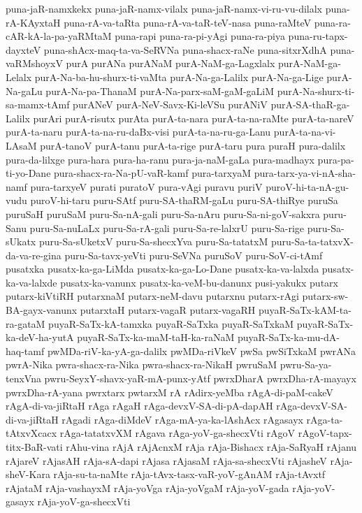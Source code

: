 {puna-jaR-namxkekx
puna-jaR-namx-vilalx
puna-jaR-namx-vi-ru-vu-dilalx
puna-rA-KAyxtaH
puna-rA-va-taRta
puna-rA-va-taR-teV-nasa
puna-raMteV
puna-ra-cAR-kA-la-pa-yaRMtaM
puna-rapi
puna-ra-pi-yAgi
puna-ra-piya
puna-ru-tapx-dayxteV
puna-shAcx-maq-ta-va-SeRVNa
puna-shacx-raNe
puna-sitxrXdhA
puna-vaRMshoyxV
purA
purANa
purANaM
purA-NaM-ga-Lagxlalx
purA-NaM-ga-Lelalx
purA-Na-ba-hu-shurx-ti-vaMta
purA-Na-ga-Lalilx
purA-Na-ga-Lige
purA-Na-gaLu
purA-Na-pa-ThanaM
purA-Na-parx-saM-gaM-gaLiM
purA-Na-shurx-ti-sa-mamx-tAmf
purANeV
purA-NeV-Savx-Ki-leVSu
purANiV
purA-SA-thaR-ga-Lalilx
purAri
purA-risutx
purAta
purA-ta-nara
purA-ta-na-raMte
purA-ta-nareV
purA-ta-naru
purA-ta-na-ru-daBx-visi
purA-ta-na-ru-ga-Lanu
purA-ta-na-vi-LAsaM
purA-tanoV
purA-tanu
purA-ta-rige
purA-taru
pura
puraH
pura-dalilx
pura-da-lilxge
pura-hara
pura-ha-ranu
pura-ja-naM-gaLa
pura-madhayx
pura-pa-ti-yo-Dane
pura-shacx-ra-Na-pU-vaR-kamf
pura-tarxyaM
pura-tarx-ya-vi-nA-sha-namf
pura-tarxyeV
purati
puratoV
pura-vAgi
puravu
puriV
puroV-hi-ta-nA-gu-vudu
puroV-hi-taru
puru-SAtf
puru-SA-thaRM-gaLu
puru-SA-thiRye
puruSa
puruSaH
puruSaM
puru-Sa-nA-gali
puru-Sa-nAru
puru-Sa-ni-goV-sakxra
puru-Sanu
puru-Sa-nuLaLx
puru-Sa-rA-gali
puru-Sa-re-lalxrU
puru-Sa-rige
puru-Sa-sUkatx
puru-Sa-sUketxV
puru-Sa-shecxYva
puru-Sa-tatatxM
puru-Sa-ta-tatxvX-da-va-re-gina
puru-Sa-tavx-yeVti
puru-SeVNa
puruSoV
puru-SoV-ci-tAmf
pusatxka
pusatx-ka-ga-LiMda
pusatx-ka-ga-Lo-Dane
pusatx-ka-va-lalxda
pusatx-ka-va-lalxde
pusatx-ka-vanunx
pusatx-ka-veM-bu-danunx
pusi-yakukx
putarx
putarx-kiVtiRH
putarxnaM
putarx-neM-davu
putarxnu
putarx-rAgi
putarx-sw-BA-gayx-vanunx
putarxtaH
putarx-vagaR
putarx-vagaRH
puyaR-SaTx-kAM-ta-ra-gataM
puyaR-SaTx-kA-tamxka
puyaR-SaTxka
puyaR-SaTxkaM
puyaR-SaTx-ka-deV-ha-yutA
puyaR-SaTx-ka-maM-taH-ka-raNaM
puyaR-SaTx-ka-mu-dA-haq-tamf
pwMDa-riV-ka-yA-ga-dalilx
pwMDa-riVkeV
pwSa
pwSiTxkaM
pwrANa
pwrA-Nika
pwra-shacx-ra-Nika
pwra-shacx-ra-NikaH
pwruSaM
pwru-Sa-ya-tenxVna
pwru-SeyxY-shavx-yaR-mA-punx-yAtf
pwrxDharA
pwrxDha-rA-mayayx
pwrxDha-rA-yana
pwrxtarx
pwtarxM
rA
rAdirx-yeMba
rAgA-di-paM-cakeV
rAgA-di-va-jiRtaH
rAga
rAgaH
rAga-devxV-SA-di-pA-dapAH
rAga-devxV-SA-di-va-jiRtaH
rAgadi
rAga-diMdeV
rAga-mA-ya-ka-lAshAcx
rAgasayx
rAga-ta-tAtxvXcacx
rAga-tatatxvXM
rAgava
rAga-yoV-ga-shecxVti
rAgoV
rAgoV-tapx-titx-BaR-vati
rAhu-vina
rAjA
rAjAcnxM
rAja
rAja-Bishacx
rAja-SaRyaH
rAjanu
rAjareV
rAjasAH
rAja-sA-dapi
rAjasa
rAjasaM
rAja-sa-shecxVti
rAjasheV
rAja-sheV-Kara
rAja-su-ta-naMte
rAja-tAvx-tasx-vaR-yoV-gAnAM
rAja-tAvxtf
rAjataM
rAja-vashayxM
rAja-yoVga
rAja-yoVgaM
rAja-yoV-gada
rAja-yoV-gasayx
rAja-yoV-ga-shecxVti
}
